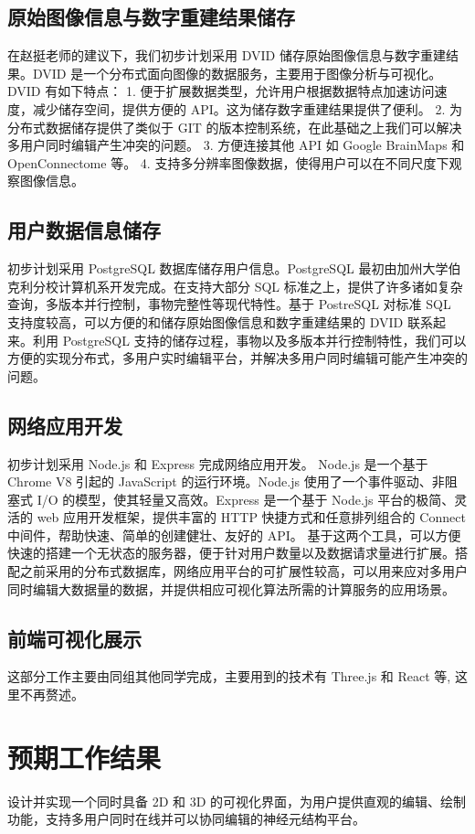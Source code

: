 \subsection{原始图像信息与数字重建结果储存}
在赵挺老师的建议下，我们初步计划采用 DVID 储存原始图像信息与数字重建结果。DVID 是一个分布式面向图像的数据服务，主要用于图像分析与可视化。DVID 有如下特点：
1. 便于扩展数据类型，允许用户根据数据特点加速访问速度，减少储存空间，提供方便的 API。这为储存数字重建结果提供了便利。
2. 为分布式数据储存提供了类似于 GIT 的版本控制系统，在此基础之上我们可以解决多用户同时编辑产生冲突的问题。
3. 方便连接其他 API 如 Google BrainMaps 和 OpenConnectome 等。
4. 支持多分辨率图像数据，使得用户可以在不同尺度下观察图像信息。

\subsection{用户数据信息储存}
初步计划采用 PostgreSQL 数据库储存用户信息。PostgreSQL 最初由加州大学伯克利分校计算机系开发完成。在支持大部分 SQL 标准之上，提供了许多诸如复杂查询，多版本并行控制，事物完整性等现代特性。基于 PostreSQL 对标准 SQL 支持度较高，可以方便的和储存原始图像信息和数字重建结果的 DVID 联系起来。利用 PostgreSQL 支持的储存过程，事物以及多版本并行控制特性，我们可以方便的实现分布式，多用户实时编辑平台，并解决多用户同时编辑可能产生冲突的问题。

\subsection{网络应用开发}
初步计划采用 Node.js 和 Express 完成网络应用开发。
Node.js 是一个基于 Chrome V8 引起的 JavaScript 的运行环境。Node.js 使用了一个事件驱动、非阻塞式 I/O 的模型，使其轻量又高效。Express 是一个基于 Node.js 平台的极简、灵活的 web 应用开发框架，提供丰富的 HTTP 快捷方式和任意排列组合的 Connect 中间件，帮助快速、简单的创建健壮、友好的 API。
基于这两个工具，可以方便快速的搭建一个无状态的服务器，便于针对用户数量以及数据请求量进行扩展。搭配之前采用的分布式数据库，网络应用平台的可扩展性较高，可以用来应对多用户同时编辑大数据量的数据，并提供相应可视化算法所需的计算服务的应用场景。

\subsection{前端可视化展示}
这部分工作主要由同组其他同学完成，主要用到的技术有 Three.js 和 React 等, 这里不再赘述。 

\section{预期工作结果}
设计并实现一个同时具备 2D 和 3D 的可视化界面，为用户提供直观的编辑、绘制功能，支持多用户同时在线并可以协同编辑的神经元结构平台。


